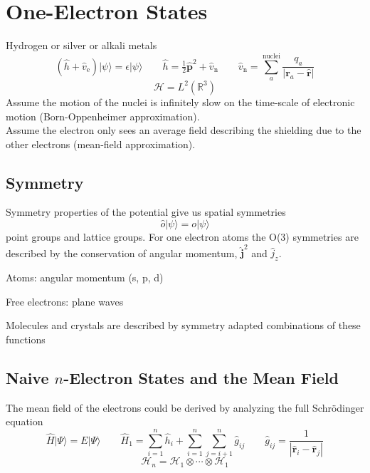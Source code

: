 \section{One-Electron States}

Hydrogen or silver or alkali metals
\begin{equation}
    (\hat{h} + \hat{v}_\mathrm{e})
    |\psi\rangle
    =
    \epsilon
    |\psi\rangle
    \qquad
    \hat{h}
    =
    \tfrac{1}{2}
    \hat{\mathbf{p}}^2
    +
    \hat{v}_\mathrm{n}
    \qquad
    \hat{v}_\mathrm{n}
    =
    \sum_a^{\mathrm{nuclei}}
    \frac{q_a}{|\mathbf{r}_a-\hat{\mathbf{r}}|}
\end{equation}
\begin{equation}
    \mathcal{H}
    =
    L^2(\mathbb{R}^3)
\end{equation}
Assume the motion of the nuclei is infinitely slow on the time-scale of
electronic motion (Born-Oppenheimer approximation).\\
Assume the electron only sees an average field describing the shielding due to
the other electrons (mean-field approximation).

\subsection{Symmetry}

Symmetry properties of the potential give us spatial symmetries
\begin{equation}
    \hat{o}
    |\psi\rangle
    =
    o
    |\psi\rangle
\end{equation}
point groups and lattice groups.
For one electron atoms the O(3) symmetries are described by the conservation of
angular momentum, \(\hat{\mathbf{j}}^2\) and \(\hat{j}_z\).

\noindent
Atoms: angular momentum (s, p, d)

\noindent
Free electrons: plane waves

\noindent
Molecules and crystals are described by symmetry adapted combinations of these
functions

\subsection{Naive \(n\)-Electron States and the Mean Field}
The mean field of the electrons could be derived by analyzing the full
Schr\"odinger equation
\begin{equation}
    \hat{H}
    |\Psi\rangle
    =
    E
    |\Psi\rangle
    \qquad
    \hat{H}_1
    =
    \sum_{i=1}^n
    \hat{h}_i
    +
    \sum_{i=1}^n
    \sum_{j=i+1}^n
    \hat{g}_{ij}
    \qquad
    \hat{g}_{ij}
    =
    \frac{1}{|\hat{\mathbf{r}}_i-\hat{\mathbf{r}}_j|}
\end{equation}
\begin{equation}
    \mathcal{H}_n
    =
    \mathcal{H}_1
    \otimes
    \cdots
    \otimes
    \mathcal{H}_1
\end{equation}


